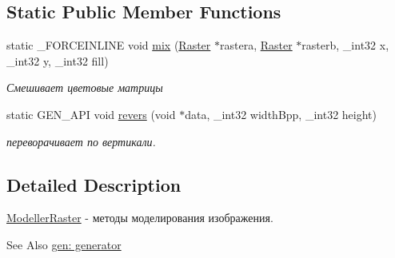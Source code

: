 \subsection*{Static Public Member Functions}
\begin{DoxyCompactItemize}
\item 
\hypertarget{classgen_1_1_modeller_raster_a0c18c0642f4c84094d8cd6c0afed975e}{static \-\_\-\-F\-O\-R\-C\-E\-I\-N\-L\-I\-N\-E void \hyperlink{classgen_1_1_modeller_raster_a0c18c0642f4c84094d8cd6c0afed975e}{mix} (\hyperlink{struct_raster}{Raster} $\ast$rastera, \hyperlink{struct_raster}{Raster} $\ast$rasterb, \-\_\-int32 x, \-\_\-int32 y, \-\_\-int32 fill)}\label{classgen_1_1_modeller_raster_a0c18c0642f4c84094d8cd6c0afed975e}

\begin{DoxyCompactList}\small\item\em Смешивает цветовые матрицы \end{DoxyCompactList}\item 
\hypertarget{classgen_1_1_modeller_raster_a1ef12ff68a05743b6182d316028bf375}{static G\-E\-N\-\_\-\-A\-P\-I void \hyperlink{classgen_1_1_modeller_raster_a1ef12ff68a05743b6182d316028bf375}{revers} (void $\ast$data, \-\_\-int32 width\-Bpp, \-\_\-int32 height)}\label{classgen_1_1_modeller_raster_a1ef12ff68a05743b6182d316028bf375}

\begin{DoxyCompactList}\small\item\em переворачивает по вертикали. \end{DoxyCompactList}\end{DoxyCompactItemize}


\subsection{Detailed Description}
\hyperlink{classgen_1_1_modeller_raster}{Modeller\-Raster} -\/ методы моделирования изображения. 

\begin{DoxySeeAlso}{See Also}
\hyperlink{group__generator}{gen\-: generator} 
\end{DoxySeeAlso}
